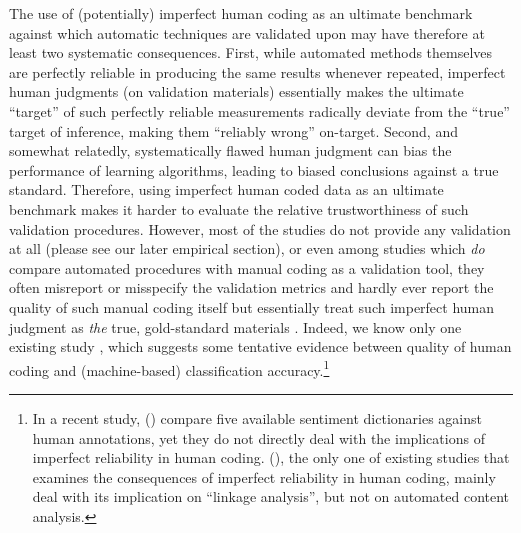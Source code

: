 \documentclass[man, 12pt, a4paper, nolmodern, noextraspace]{apa6}
\begin{document}
    The use of (potentially) imperfect human coding as an ultimate benchmark against which automatic techniques are validated upon may have therefore at least two systematic consequences. First, while automated methods themselves are perfectly reliable in producing the same results whenever repeated, imperfect human judgments (on validation materials) essentially makes the ultimate \enquote{target} of such perfectly reliable measurements radically deviate from the \enquote{true} target of inference, making them \enquote{reliably wrong} on-target. Second, and somewhat relatedly, systematically flawed human judgment can bias the performance of learning algorithms, leading to biased conclusions against a true standard. Therefore, using imperfect human coded data as an ultimate benchmark makes it harder to evaluate the relative trustworthiness of such validation procedures. However, most of the studies do not provide any validation at all (please see our later empirical section), or even among studies which \textit{do} compare automated procedures with manual coding as a validation tool, they often misreport or misspecify the validation metrics and hardly ever report the quality of such manual coding itself but essentially treat such imperfect human judgment as \textit{the} true, gold-standard materials \parencites[e.g.,][]{gonzalez2015signals, lowe2013validating, YoungSoroka2012}. Indeed, we know only one existing study \parencite{burscher2014teaching}, which suggests some tentative evidence between quality of human coding and (machine-based) classification accuracy.\footnote{In a recent study, \citeauthor{gonzalez2015signals} (\citeyear{gonzalez2015signals}) compare five available sentiment dictionaries against human annotations, yet they do not directly deal with the implications of imperfect reliability in human coding. \citeauthor{scharkow2017measurement} (\citeyear{scharkow2017measurement}), the only one of existing studies that examines the consequences of imperfect reliability in human coding, mainly deal with its implication on \enquote{linkage analysis}, but not on automated content analysis.}     
   
\end{document}

